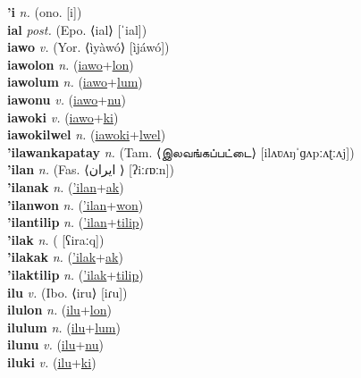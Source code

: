 \textbf{'i} \textit{n.} (ono. [i])
 \label{'i} \\
\textbf{ial} \textit{post.} (Epo. ⟨ial⟩ [ˈial])
 \label{ial} \\
\textbf{iawo} \textit{v.} (Yor. ⟨ìyàwó⟩ [ìjáwó])
 \label{iawo} \\
\textbf{iawolon} \textit{n.} (\hyperref[iawo]{iawo}+\hyperref[lon]{lon})
 \label{iawolon} \\
\textbf{iawolum} \textit{n.} (\hyperref[iawo]{iawo}+\hyperref[lum]{lum})
 \label{iawolum} \\
\textbf{iawonu} \textit{v.} (\hyperref[iawo]{iawo}+\hyperref[nu]{nu})
 \label{iawonu} \\
\textbf{iawoki} \textit{v.} (\hyperref[iawo]{iawo}+\hyperref[ki]{ki})
 \label{iawoki} \\
\textbf{iawokilwel} \textit{n.} (\hyperref[iawoki]{iawoki}+\hyperref[lwel]{lwel})
 \label{iawokilwel} \\
\textbf{'ilawankapatay} \textit{n.} (Tam. ⟨இலவங்கப்பட்டை⟩ [ilʌʋʌŋˈɡʌpːʌʈːʌj])
 \label{'ilawankapatay} \\
\textbf{'ilan} \textit{n.} (Fas. ⟨ایران‎ ⟩ [ʔiːɾɒːn])
 \label{'ilan} \\
\textbf{'ilanak} \textit{n.} (\hyperref['ilan]{'ilan}+\hyperref[ak]{ak})
 \label{'ilanak} \\
\textbf{'ilanwon} \textit{n.} (\hyperref['ilan]{'ilan}+\hyperref[won]{won})
 \label{'ilanwon} \\
\textbf{'ilantilip} \textit{n.} (\hyperref['ilan]{'ilan}+\hyperref[tilip]{tilip})
 \label{'ilantilip} \\
\textbf{'ilak} \textit{n.} ( [ʕiraːq])
 \label{'ilak} \\
\textbf{'ilakak} \textit{n.} (\hyperref['ilak]{'ilak}+\hyperref[ak]{ak})
 \label{'ilakak} \\
\textbf{'ilaktilip} \textit{n.} (\hyperref['ilak]{'ilak}+\hyperref[tilip]{tilip})
 \label{'ilaktilip} \\
\textbf{ilu} \textit{v.} (Ibo. ⟨iru⟩ [iɾu])
 \label{ilu} \\
\textbf{ilulon} \textit{n.} (\hyperref[ilu]{ilu}+\hyperref[lon]{lon})
 \label{ilulon} \\
\textbf{ilulum} \textit{n.} (\hyperref[ilu]{ilu}+\hyperref[lum]{lum})
 \label{ilulum} \\
\textbf{ilunu} \textit{v.} (\hyperref[ilu]{ilu}+\hyperref[nu]{nu})
 \label{ilunu} \\
\textbf{iluki} \textit{v.} (\hyperref[ilu]{ilu}+\hyperref[ki]{ki})
 \label{iluki} \\
